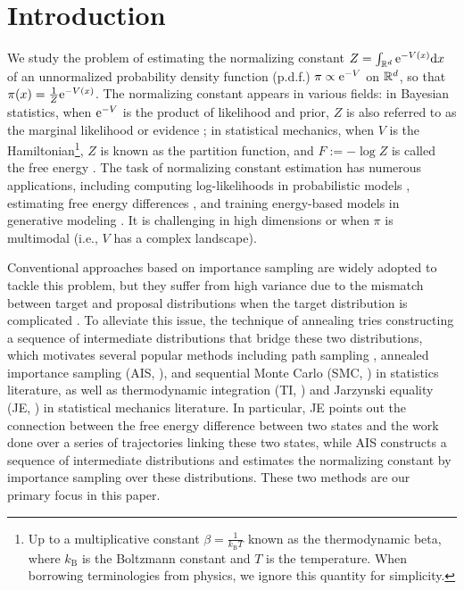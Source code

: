 \section{Introduction}
\label{sec:intro}
We study the problem of estimating the normalizing constant $Z=\int_{\mathbb{R}^d}\mathrm{e}^{-V(x)}\mathrm{d} x$ of an unnormalized probability density function (p.d.f.) $\pi\propto\mathrm{e}^{-V}$ on $\mathbb{R}^d$, so that $\pi(x)=\frac{1}{Z}\mathrm{e}^{-V(x)}$. The normalizing constant appears in various fields: in Bayesian statistics, when $\mathrm{e}^{-V}$ is the product of likelihood and prior, $Z$ is also referred to as the marginal likelihood or evidence \citep{gelman2013bayesian}; in statistical mechanics, when $V$ is the Hamiltonian\footnote{Up to a multiplicative constant $\beta=\frac{1}{k_\mathrm{B}T}$ known as the thermodynamic beta, where $k_\mathrm{B}$ is the Boltzmann constant and $T$ is the temperature. When borrowing terminologies from physics, we ignore this quantity for simplicity.}, $Z$ is known as the partition function, and $F:=-\log Z$ is called the free energy \citep{chipot2007free,lelievre2010free,pohorille2010good}. The task of normalizing constant estimation has numerous applications, including computing log-likelihoods in probabilistic models \citep{sohl2012hamiltonian}, estimating free energy differences \citep{lelievre2010free}, and training energy-based models in generative modeling \citep{song2021how,carbone2023efficient,sander2025joint}. It is challenging in high dimensions or when $\pi$ is multimodal (i.e., $V$ has a complex landscape).

Conventional approaches based on importance sampling \citep{meng1996simulating} are widely adopted to tackle this problem, but they suffer from high variance due to the mismatch between target and proposal distributions when the target distribution is complicated \citep{chatterjee2018the}. To alleviate this issue, the technique of annealing tries constructing a sequence of intermediate distributions that bridge these two distributions, which motivates several popular methods including path sampling \citep{chen1997on,gelman1998simulating}, annealed importance sampling (AIS, \cite{neal2001annealed}), and sequential Monte Carlo (SMC, \cite{doucet2000sequential,delmoral2006sequential,syed2024optimised}) in statistics literature, as well as thermodynamic integration (TI, \cite{kirkwood1935statistical}) and Jarzynski equality (JE, \cite{jarzynski1997nonequilibrium,ge2008generalized,hartmann2019jarzynski}) in statistical mechanics literature. In particular, JE points out the connection between the free energy difference between two states and the work done over a series of trajectories linking these two states, while AIS constructs a sequence of intermediate distributions and estimates the normalizing constant by importance sampling over these distributions. These two methods are our primary focus in this paper.

